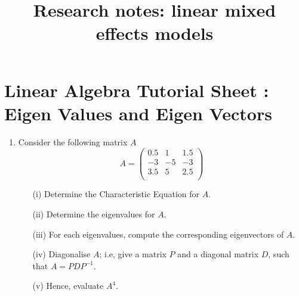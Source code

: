 \documentclass[12pt, a4paper]{report}
\title{Research notes: linear mixed effects models}
\author{ } \date{ }
\theoremstyle{plain}
\theoremstyle{definition}
\theoremstyle{remark}
\begin{document}
\section*{Linear Algebra Tutorial Sheet : Eigen Values and Eigen Vectors}
\begin{enumerate}
\item Consider the following matrix $A$ 
\[
A = \left(\begin{array}{rrr} 
0.5 & 1 & 1.5 \\
-3  & -5 & -3\\
3.5 & 5  & 2.5 \\ \end{array}\right)
\]
\begin{itemize}
\item[(i)]  Determine the Characteristic Equation for $A$.
\item[(ii)]  Determine the eigenvalues for $A$.
\item[(iii)]  For each eigenvalues, compute the corresponding eigenvectors of $A$.

\medskip\item[(iv)]  Diagonalise $A$; i.e, give a matrix $P$ and a diagonal matrix $D$, such that $A=PDP^{-1}$.

\medskip \item[(v)]  Hence, evaluate $A^4$.
\end{itemize} 


\end{enumerate}
\end{document}
